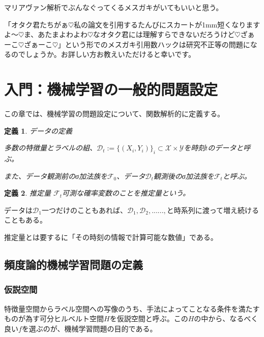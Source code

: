 \documentclass{jsarticle}
\newtheorem{defi}{定義}[section]
\begin{document}
マリアヴァン解析でぶんなぐってくるメスガキがいてもいいと思う。

「オタク君たちがぁ$\heartsuit$私の論文を引用するたんびにスカートが1mm短くなりますよ～$\heartsuit$ま、あたまよわよわ$\heartsuit$なオタク君には理解すらできないだろうけど$\heartsuit$ざぁーこ$\heartsuit$ざぁーこ$\heartsuit$」という形でのメスガキ引用数ハックは研究不正等の問題になるのでしょうか。お詳しい方お教えいただけると幸いです。

\newpage





\section{入門：機械学習の一般的問題設定}

この章では、機械学習の問題設定について、関数解析的に定義する。

\begin{defi} データの定義

多数の特徴量とラベルの組、$\mathcal{D}_t:=\{(X_i,Y_i)\}_i\subset \mathcal{X}\times \mathcal{Y}$を時刻$t$のデータと呼ぶ。

また、データ観測前のσ加法族を$\mathcal{F}_0$、データ$\mathcal{D}_t$観測後のσ加法族を$\mathcal{F}_t$と呼ぶ。


\end{defi}
\begin{defi} 推定量
$\mathcal{F}_t$可測な確率変数のことを推定量という。
\end{defi}

データは$\mathcal{D}_1$一つだけのこともあれば、$\mathcal{D}_1,\mathcal{D}_2,......,$と時系列に渡って増え続けることもある。

推定量とは要するに「その時刻の情報で計算可能な数値」である。

\subsection{頻度論的機械学習問題の定義}



\subsubsection{仮説空間}

特徴量空間からラベル空間への写像のうち、手法によってことなる条件を満たすものが為す可分ヒルベルト空間$H$を仮説空間と呼ぶ。この$H$の中から、なるべく良い$f$を選ぶのが、機械学習問題の目的である。
\end{document}
